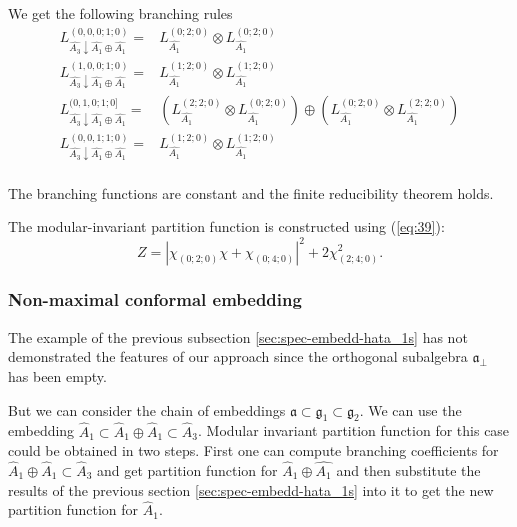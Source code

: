 \documentclass[a4paper,12pt]{article}
\theoremstyle{definition} \newtheorem{Def}{Definition}
\begin{document}
 We get the following branching rules
 \begin{equation}
   \label{eq:39}
   \begin{array}{ll}
     L^{(0,0,0;1;0)}_{\hat{A_3}\downarrow \hat{A_1}\oplus \hat{A_1}}= & L_{\hat{A_1}}^{(0;2;0)}\otimes L_{\hat{A_1}}^{(0;2;0)} \\
     L^{(1,0,0;1;0)}_{\hat{A_3}\downarrow \hat{A_1}\oplus \hat{A_1}}= & L_{\hat{A_1}}^{(1;2;0)}\otimes L_{\hat{A_1}}^{(1;2;0)} \\
     L^{(0,1,0;1;0]}_{\hat{A_3}\downarrow \hat{A_1}\oplus \hat{A_1}}= & \left( L_{\hat{A_1}}^{(2;2;0)}\otimes L_{\hat{A_1}}^{(0;2;0)}\right) \oplus \left( L_{\hat{A_1}}^{(0;2;0)}\otimes L_{\hat{A_1}}^{(2;2;0)}\right) \\
     L^{(0,0,1;1;0)}_{\hat{A_3}\downarrow \hat{A_1}\oplus \hat{A_1}}= & L_{\hat{A_1}}^{(1;2;0)}\otimes L_{\hat{A_1}}^{(1;2;0)} \\     
   \end{array}
 \end{equation}

The branching functions are constant and the finite reducibility theorem holds. 

The modular-invariant partition function is constructed using (\ref{eq:39}):
\begin{equation}
  \label{eq:45}
  Z=\left|\chi_{(0;2;0)}\chi+\chi_{(0;4;0)}\right|^2+2\chi_{(2;4;0)}^2.
\end{equation}


\subsubsection{Non-maximal conformal embedding}
\label{sec:non-maxim-conf}

The example of the previous subsection \ref{sec:spec-embedd-hata_1s} has not demonstrated the features of our approach since the orthogonal subalgebra $\mathfrak{a}_{\bot}$ has been empty. 

But we can consider the chain of embeddings $\mathfrak{a}\subset\mathfrak{g}_1\subset\mathfrak{g}_2$. We can use the embedding $\hat{A}_1\subset\hat{A}_1\oplus\hat{A}_1\subset\hat{A}_{3}$. Modular invariant partition function for this case could be obtained in two steps. First one can compute branching coefficients for $\hat{A}_1\oplus\hat{A}_1\subset\hat{A}_{3}$ and get partition function for $\hat{A}_1\oplus\hat{A_1}$ and then substitute the results of the previous section \ref{sec:spec-embedd-hata_1s} into it to get the new partition function for $\hat{A}_1$. 
\end{document}
